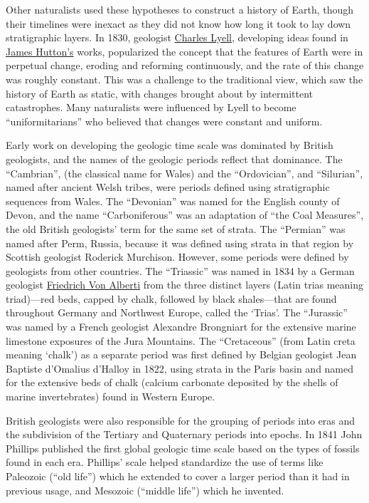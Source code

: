 Other naturalists used these hypotheses to construct a history of Earth,
though their timelines were inexact as they did not know how long it
took to lay down stratigraphic layers. In 1830, geologist \href{https://en.wikipedia.org/wiki/Charles_Lyell}{Charles Lyell},
developing ideas found in \href{https://en.wikipedia.org/wiki/James_Hutton}{James Hutton's} works, popularized the concept
that the features of Earth were in perpetual change, eroding and
reforming continuously, and the rate of this change was roughly
constant. This was a challenge to the traditional view, which saw the
history of Earth as static, with changes brought about by intermittent
catastrophes. Many naturalists were influenced by Lyell to become
``uniformitarians'' who believed that changes were constant and uniform.

Early work on developing the geologic time scale was dominated by
British geologists, and the names of the geologic periods reflect that
dominance. The ``Cambrian'', (the classical name for Wales) and the
``Ordovician'', and ``Silurian'', named after ancient Welsh tribes, were
periods defined using stratigraphic sequences from Wales. The
``Devonian'' was named for the English county of Devon, and the name
``Carboniferous'' was an adaptation of ``the Coal Measures'', the old
British geologists' term for the same set of strata. The ``Permian'' was
named after Perm, Russia, because it was defined using strata in that
region by Scottish geologist Roderick Murchison. However, some periods
were defined by geologists from other countries. The ``Triassic'' was
named in 1834 by a German geologist \href{https://en.wikipedia.org/wiki/Friedrich_August_von_Alberti}{Friedrich Von Alberti} from the three
distinct layers (Latin trias meaning triad)---red beds, capped by chalk,
followed by black shales---that are found throughout Germany and
Northwest Europe, called the `Trias'. The ``Jurassic'' was named by a
French geologist Alexandre Brongniart for the extensive marine limestone
exposures of the Jura Mountains. The ``Cretaceous'' (from Latin creta
meaning `chalk') as a separate period was first defined by Belgian
geologist Jean Baptiste d'Omalius d'Halloy in 1822, using strata in the Paris
basin and named for the extensive beds of chalk (calcium carbonate
deposited by the shells of marine invertebrates) found in Western
Europe.

British geologists were also responsible for the grouping of periods
into eras and the subdivision of the Tertiary and Quaternary periods
into epochs. In 1841 John Phillips published the first global geologic
time scale based on the types of fossils found in each era. Phillips'
scale helped standardize the use of terms like Paleozoic (``old life'')
which he extended to cover a larger period than it had in previous
usage, and Mesozoic (``middle life'') which he invented.

